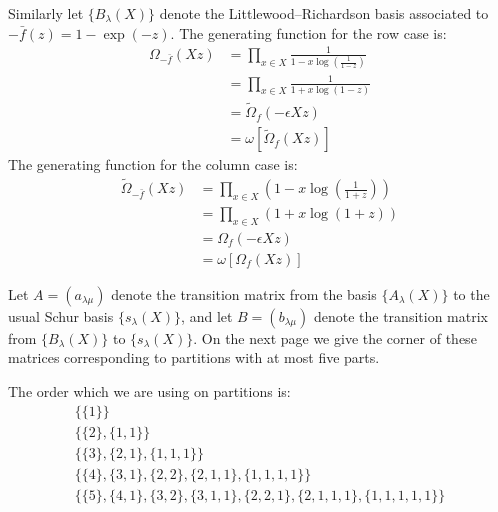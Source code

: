 \documentclass[12pt,dvips]{amsart}
\begin{document}
Similarly let $\{B_\lambda(X)\}$ denote the Littlewood--Richardson basis associated to $-\bar{f}(z) = 1 - \exp(-z)$. The generating function for the row case is:
\begin{align*}
\Omega_{-\bar{f}}(Xz)
& =  \prod_{x \in X} \frac{1}{1 - x  \log \left ( \frac{1}{1-z} \right )}  \\
& =  \prod_{x \in X} \frac{1}{1 + x \log(1-z)} \\
& =  \tilde{\Omega}_f(-\epsilon Xz) \\
& =  \omega[ \tilde{\Omega}_f(Xz)]
\end{align*}
The generating function for the column case is:
\begin{align*}
\tilde{\Omega}_{-\bar{f}}(Xz) %
& =  \prod_{x \in X} (1 - x \log \left ( \frac{1}{1+z} \right )) \\ 
& =  \prod_{x \in X} (1 + x \log (1 + z)) \\
& =  \Omega_f(- \epsilon Xz) \\
& =  \omega[ \Omega_f(Xz) ]
\end{align*}

Let $A = (a_{\lambda \mu})$ denote the transition matrix from the basis $\{A_{\lambda}(X)\}$ to the usual Schur basis $\{s_\lambda(X)\}$, and let $B = (b_{\lambda \mu})$ denote the transition matrix from $\{B_\lambda(X)\}$ to $\{s_\lambda(X)\}$. On the next page we give the corner of these matrices corresponding to partitions with at most five parts.

\par\bigskip
The order which we are using on partitions is:
\begin{gather*}
\{ \{1\} \}
\\
\{ \{2\}, \{1, 1\} \}
\\
\{ \{3\}, \{2, 1\}, \{1, 1, 1\} \}
\\
 \{ \{4\}, \{3, 1\}, \{2, 2\}, \{2, 1, 1\}, \{1, 1, 1, 1\} \} 
\\
\{ \{5\}, \{4, 1\}, \{3, 2\}, \{3, 1, 1\}, \{2, 2, 1\}, \{2, 1, 1, 1\}, \{1, 1, 1, 1, 1\} \}
\end{gather*}
\end{document}
